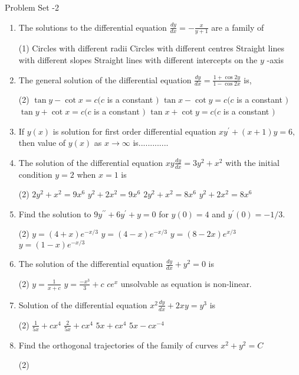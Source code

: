 \begin{abox}
	Problem Set -2
\end{abox}
\begin{enumerate}[label=\color{ocre}\textbf{\arabic*.}]
	\item The solutions to the differential equation $\frac{d y}{d x}=-\frac{x}{y+1}$ are a family of
	\begin{tasks}(1)
		\task[\textbf{a.}]Circles with different radii 
		\task[\textbf{b.}]Circles with different centres
		\task[\textbf{c.}]Straight lines with different slopes
		\task[\textbf{d.}]Straight lines with different intercepts on the $y$ -axis
	\end{tasks}
\item  The general solution of the differential equation $\frac{d y}{d x}=\frac{1+\cos 2 y}{1-\cos 2 x}$ is,
\begin{tasks}(2)
	\task[\textbf{a.}]$\tan y-\cot x=c(c$ is a constant $)$
	\task[\textbf{b.}]$\tan x-\cot y=c(c$ is a constant $)$
	\task[\textbf{c.}] $\tan y+\cot x=c(c$ is a constant $)$
	\task[\textbf{d.}] $\tan x+\cot y=c(c$ is a constant $)$
\end{tasks}
\item If $y(x)$ is solution for first order differential equation $x y^{\prime}+(x+1) y=6,$ then value of
$y(x)$ as $x \rightarrow \infty$ is.............

\item The solution of the differential equation $x y \frac{d y}{d x}=3 y^{2}+x^{2}$ with the initial condition $y=2$
when $x=1$ is\begin{tasks}(2)
	\task[\textbf{a.}] $2 y^{2}+x^{2}=9 x^{6}$ 
	\task[\textbf{b.}]$y^{2}+2 x^{2}=9 x^{6}$
	\task[\textbf{c.}]$2 y^{2}+x^{2}=8 x^{6}$ 
	\task[\textbf{d.}]$y^{2}+2 x^{2}=8 x^{6}$ 
\end{tasks}	

\item Find the solution to $9 y^{\prime \prime}+6 y^{\prime}+y=0$ for $y(0)=4$ and $y^{\prime}(0)=-1 / 3$.
\begin{tasks}(2)
	\task[\textbf{a.}]  $y=(4+x) e^{-x / 3}$ 
	\task[\textbf{b.}] $y=(4-x) e^{-x / 3}$
	\task[\textbf{c.}] $y=(8-2 x) e^{x / 3}$ 
	\task[\textbf{d.}] $y=(1-x) e^{-x / 3}$
\end{tasks}
\item The solution of the differential equation $\frac{d y}{d x}+y^{2}=0$ is
\begin{tasks}(2)
	\task[\textbf{a.}]  $y=\frac{1}{x+c}$ 
	\task[\textbf{b.}]$y=\frac{-x^{3}}{3}+c$
	\task[\textbf{c.}]$c e^{x}$ 
	\task[\textbf{d.}]unsolvable as equation is non-linear. 
\end{tasks}
\item Solution of the differential equation $x^{2} \frac{d y}{d x}+2 x y=y^{3}$ is
\begin{tasks}(2)
	\task[\textbf{a.}] $\frac{1}{5 x}+c x^{4}$ 
	\task[\textbf{b.}]$ \frac{2}{5 x}+c x^{4} $ 
	\task[\textbf{c.}]$5 x+c x^{4} $  
	\task[\textbf{d.}]$5 x-c x^{-4}$ 
\end{tasks}
\item Find the orthogonal trajectories of the family of curves $x^{2}+y^{2}=C$
\begin{tasks}(2)
	

\end{tasks}
\end{enumerate}
